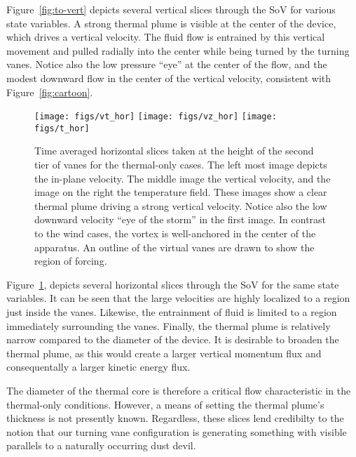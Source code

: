 %
%
%
Figure~\ref{fig:to-vert} depicts several vertical slices through the SoV
for various state variables. A strong thermal plume is visible at the
center of the device, which drives a vertical velocity. The fluid flow
is entrained by this vertical movement and pulled radially into the
center while being turned by the turning vanes. Notice also the low
pressure ``eye'' at the center of the flow, and the modest downward flow
in the center of the vertical velocity, consistent with
Figure~\ref{fig:cartoon}. 

\begin{figure}[htb]

 \centering
  \texttt{[image: figs/vt\_hor]}
 \hfill
  \texttt{[image: figs/vz\_hor]}
 \hfill
  \texttt{[image: figs/t\_hor]}
 \caption{Time averaged horizontal slices taken at the height of the
 second tier of vanes for the thermal-only cases. The left most image
 depicts the in-plane velocity. The middle image the vertical velocity,
 and the image on the right the temperature field. These images show a
 clear thermal plume driving a strong vertical velocity. Notice also the
 low downward velocity ``eye of the storm'' in the first image. In
 contrast to the wind cases, the vortex is well-anchored in the center
 of the apparatus. An outline of the virtual vanes are drawn to show the
 region of forcing.}
 \label{fig:to-hor}
\end{figure}

Figure~\ref{fig:to-hor}, depicts several horizontal slices
through the SoV for the same state variables. It can be seen that the
large velocities are highly localized to a region just inside the
vanes. Likewise, the entrainment of fluid is limited to a region
immediately surrounding the vanes. 
%
%
Finally, the thermal plume is relatively narrow compared to the diameter
of the device. It is desirable to broaden the thermal plume, as this
would create a larger vertical momentum flux and consequentally a larger
kinetic energy flux.  

The diameter of the thermal core is therefore a critical flow
characteristic in the thermal-only conditions. However, a means of
setting the thermal plume's thickness is not presently 
known. Regardless, these slices lend credibilty to the 
notion that our turning vane configuration is generating something with
visible parallels to a naturally occurring dust devil.   

